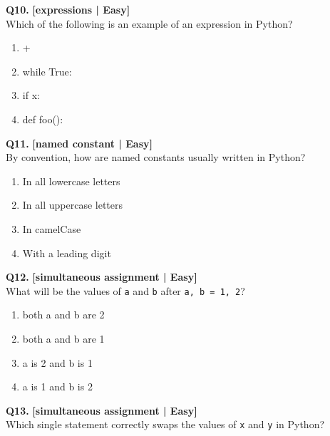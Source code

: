 \noindent\textbf{Q10.} \hfill {\small\color{LPUOrange}\textbf{[expressions | Easy]}}\\[2pt]
Which of the following is an example of an expression in Python?

\begin{enumerate}[label=(\alph*),topsep=2pt,itemsep=1pt,partopsep=0pt,parsep=0pt]
    \item {} +
    \item \relax while True:
    \item \relax if x:
    \item \relax def foo():
\end{enumerate}
\vspace{2mm}

\noindent\textbf{Q11.} \hfill {\small\color{LPUOrange}\textbf{[named constant | Easy]}}\\[2pt]
By convention, how are named constants usually written in Python?

\begin{enumerate}[label=(\alph*),topsep=2pt,itemsep=1pt,partopsep=0pt,parsep=0pt]
    \item \relax In all lowercase letters
    \item \relax In all uppercase letters
    \item \relax In camelCase
    \item \relax With a leading digit
\end{enumerate}
\vspace{2mm}

\noindent\textbf{Q12.} \hfill {\small\color{LPUOrange}\textbf{[simultaneous assignment | Easy]}}\\[2pt]
What will be the values of \texttt{a} and \texttt{b} after \texttt{a, b = 1, 2}?

\begin{enumerate}[label=(\alph*),topsep=2pt,itemsep=1pt,partopsep=0pt,parsep=0pt]
    \item \relax both a and b are 2
    \item \relax both a and b are 1
    \item \relax a is 2 and b is 1
    \item \relax a is 1 and b is 2
\end{enumerate}
\vspace{2mm}

\noindent\textbf{Q13.} \hfill {\small\color{LPUOrange}\textbf{[simultaneous assignment | Easy]}}\\[2pt]
Which single statement correctly swaps the values of \texttt{x} and \texttt{y} in Python?

